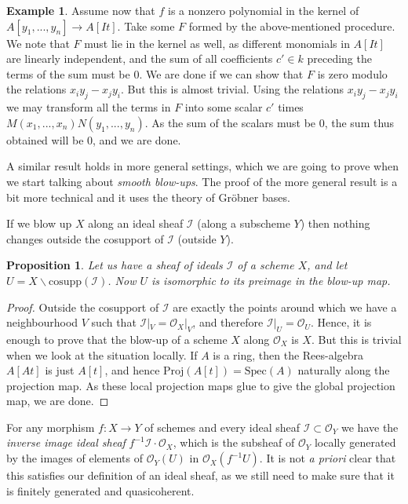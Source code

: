 \documentclass[12pt,a4paper,leqno]{article}
\newcommand{\OO}{\mathcal{O}}
\newcommand{\spec}{\mathrm{Spec}}
\newcommand{\proj}{\mathrm{Proj}}
\newcommand{\cosupp}{\mathrm{cosupp}}
\theoremstyle{plain}
\newtheorem{prop}[theo]{Proposition}
\theoremstyle{definition}
\newtheorem{ex}[theo]{Example}
\theoremstyle{remark}
\begin{document}
\begin{ex}
Assume now that $f$ is a nonzero polynomial in the kernel of $A[y_1,...,y_n] \to A[It]$. Take some $F$ formed by the above-mentioned procedure. We note that $F$ must lie in the kernel as well, as different monomials in $A[It]$ are linearly independent, and the sum of all coefficients $c' \in k$ preceding the terms of the sum must be 0. We are done if we can show that $F$ is zero modulo the relations $x_i y_j - x_j y_i$. But this is almost trivial. Using the relations $x_i y_j - x_j y_i$ we may transform all the terms in $F$ into some scalar $c'$ times $M(x_1,...,x_n)N(y_1,...,y_n)$. As the sum of the scalars must be 0, the sum thus obtained will be 0, and we are done.

A similar result holds in more general settings, which we are going to prove when we start talking about \emph{smooth blow-ups}. The proof of the more general result is a bit more technical and it uses the theory of Gröbner bases. 
\end{ex}

If we blow up $X$ along an ideal sheaf $\mathscr{I}$ (along a subscheme $Y$) then nothing changes outside the cosupport of $\mathscr{I}$ (outside $Y$).

\begin{prop}
Let us have a sheaf of ideals $\mathscr{I}$ of a scheme $X$, and let $U = X \backslash \cosupp (\mathscr{I})$. Now $U$ is isomorphic to its preimage in the blow-up map. 
\end{prop}
\begin{proof}
Outside the cosupport of $\mathscr{I}$ are exactly the points around which we have a neighbourhood $V$ such that $\mathscr{I} |_V  = \OO_X |_V$, and therefore $\mathscr{I}|_U = \OO_U$. Hence, it is enough to prove that the blow-up of a scheme $X$ along $\OO_X$ is $X$. But this is trivial when we look at the situation locally. If $A$ is a ring, then the Rees-algebra $A[At]$ is just $A[t]$, and hence $\proj (A[t]) = \spec (A)$ naturally along the projection map. As these local projection maps glue to give the global projection map, we are done.
\end{proof}

For any morphism $f: X \to Y$ of schemes and every ideal sheaf $\mathscr{I} \subset \OO_Y$ we have the \emph{inverse image ideal sheaf} $f^{-1} \mathscr{I} \cdot \OO_X$, which is the subsheaf of $\OO_Y$ locally generated by the images of elements of $\OO_Y (U)$ in $\OO_X (f^{-1} U)$. It is not \emph{a priori} clear that this satisfies our definition of an ideal sheaf, as we still need to make sure that it is finitely generated and quasicoherent.
\end{document}
